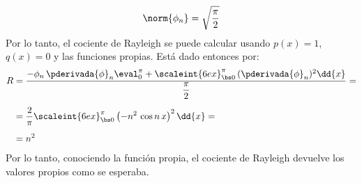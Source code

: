 \begin{ejemplo}
\begin{align*}
\norm{\phi_{n}} = \sqrt{\dfrac{\pi}{2}}
\end{align*}
Por lo tanto, el cociente de Rayleigh se puede calcular usando $p(x) = 1$, $q (x) = 0$ y las funciones propias. Está dado entonces por:
\begin{align}
\begin{aligned}[b]
R &= \dfrac{- \phi_{n} \, \pderivada{\phi}_{n} \eval_{0}^{\pi} + \scaleint{6ex}_{\bs 0}^{\pi} \, (\pderivada{\phi}_{n})^{2} \dd{x}}{\dfrac{\pi}{2}} = \\[0.5em]
&= \dfrac{2}{\pi} \scaleint{6ex}_{\bs 0}^{\pi} \left( - n^{2} \, \cos n \, x \right)^{2} \dd{x} = \\[0.5em]
&= n^{2}
\end{aligned}
\label{eq:ecuacion_04_13}
\end{align}
Por lo tanto, conociendo la función propia, el cociente de Rayleigh devuelve los valores propios como se esperaba.
\end{ejemplo}

